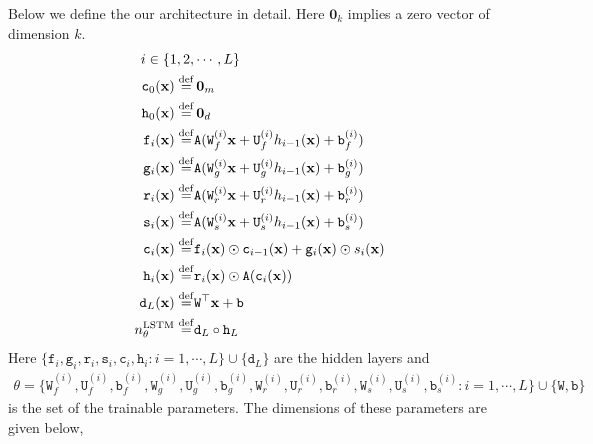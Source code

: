 Below we define the our architecture in detail. Here $\mathbf 0_k$ implies a zero vector of dimension $k$.
\begin{align}
    i\in\{1,2,&\cdots, L\}\\
    \mathtt c_0(\mathbf x)\stackrel{\rm def}{=}&\,\mathbf 0_m\label{eq:layer-c0}\\
    \mathtt h_0(\mathbf x)\stackrel{\rm def}{=}&\,\mathbf 0_d\label{eq:layer-h0}\\
    \mathtt f_i(\mathbf x) \stackrel{\rm def}{=}& \mathtt A(\mathtt W_f^{(i)}\mathbf x + \mathtt U_f^{(i)}h_{i-1}(\mathbf x) + \mathtt b_f^{(i)})\label{eq:layer-f}\\
    \mathtt g_i(\mathbf x) \stackrel{\rm def}{=}& \mathtt A(\mathtt W_g^{(i)}\mathbf x + \mathtt U_g^{(i)}h_{i-1}(\mathbf x) + \mathtt b_g^{(i)})\label{eq:layer-g}\\
    \mathtt r_i(\mathbf x) \stackrel{\rm def}{=}& \mathtt A(\mathtt W_r^{(i)}\mathbf x + \mathtt U_r^{(i)}h_{i-1}(\mathbf x) + \mathtt b_r^{(i)})\label{eq:layer-r}\\
    \mathtt s_i(\mathbf x) \stackrel{\rm def}{=}& \mathtt A(\mathtt W_s^{(i)}\mathbf x + \mathtt U_s^{(i)}h_{i-1}(\mathbf x) + \mathtt b_s^{(i)})\label{eq:layer-s}\\
    \mathtt c_i(\mathbf x) \stackrel{\rm def}{=}&  \mathtt f_i(\mathbf x)\odot \mathtt c_{i-1}(\mathbf x) + \mathtt g_i(\mathbf x)\odot s_i(\mathbf x)\label{eq:layer-c}\\
    \mathtt h_i(\mathbf x) \stackrel{\rm def}{=}& \mathtt r_i(\mathbf x)\odot \mathtt A(\mathtt c_i(\mathbf x))\label{eq:layer-h}\\
    \mathtt d_L(\mathbf x)\stackrel{\rm def}{=}&\mathtt W^\top\mathbf x + \mathtt b\label{eq:layer-final}\\
    n^{\rm LSTM}_\theta \stackrel{\rm def}{=}& \mathtt d_L\circ \mathtt h_L\label{eq:def-LSTM} 
\end{align}
Here $\{\mathtt f_i, \mathtt g_i, \mathtt r_i, \mathtt s_i, \mathtt c_i, \mathtt h_i: i=1,\cdots,L\}\cup\{\mathtt d_L\}$ are the hidden layers and
\begin{align}
    \theta=\{\mathtt W_f^{(i)}, \mathtt U_f^{(i)}, \mathtt b_f^{(i)}, \mathtt W_g^{(i)}, \mathtt U_g^{(i)}, \mathtt b_g^{(i)}, \mathtt W_r^{(i)}, \mathtt U_r^{(i)}, \mathtt b_r^{(i)}, \mathtt W_s^{(i)}, \mathtt U_s^{(i)}, \mathtt b_s^{(i)}:
i=1,\cdots,L\}\cup\{\mathtt W, \mathtt b\}\label{eq:theta-composition}
\end{align}is the set of the trainable parameters. The dimensions of these parameters are given below,

